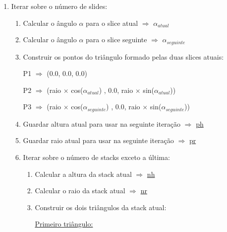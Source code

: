 \documentclass[a4paper]{article}
\begin{document}
\ttfamily
\begin{enumerate}
  \item Iterar sobre o número de slides:
  \begin{enumerate}
    \item Calcular o ângulo $\alpha$ para o slice atual $\Rightarrow$ \underline{$\alpha_{atual}$}
    \item Calcular o ângulo $\alpha$ para o slice seguinte $\Rightarrow$ \underline{$\alpha_{seguinte}$}
    \item Construir os pontos do triângulo formado pelas duas slices atuais:

    \vspace{0.5cm}

        \hspace{3cm} P1 $\Rightarrow$ (0.0, 0.0, 0.0)

    \vspace{0.2cm}

        \hspace{1cm} P2 $\Rightarrow$ (raio $\times$ cos($\alpha_{atual}$) , 0.0, raio $\times$ sin($\alpha_{atual}$))

    \vspace{0.2cm}

        \hspace{0.5cm} P3 $\Rightarrow$ (raio $\times$ cos($\alpha_{seguinte}$) , 0.0, raio $\times$ sin($\alpha_{seguinte}$))

    \vspace{0.3cm}

    \item Guardar altura atual para usar na seguinte iteração $\Rightarrow$ \underline{ph}
    \item Guardar raio atual para usar na seguinte iteração $\Rightarrow$ \underline{pr}

    \item Iterar sobre o número de stacks exceto a última:
    \begin{enumerate}
      \item Calcular a altura da stack atual $\Rightarrow$ \underline{nh}
      \item Calcular o raio da stack atual $\Rightarrow$ \underline{nr}
      \item Construir os dois triângulos da stack atual:

      \vspace{0.5cm}

      \underline{Primeiro triângulo:}


\end{enumerate}
\end{enumerate}
\end{enumerate}
\end{document}
